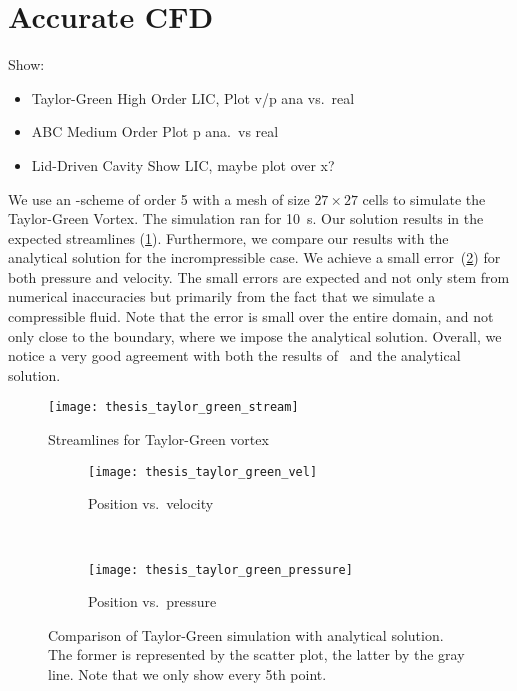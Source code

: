\section{Accurate CFD}
Show:
\begin{itemize}
\item Taylor-Green High Order
  LIC, Plot v/p ana vs.\ real
\item ABC Medium Order
  Plot p ana.\ vs real
\item Lid-Driven Cavity
  Show LIC, maybe plot over x?
\end{itemize}

We use an \aderdg{}-scheme of order 5 with a mesh of size $27 \times 27$ cells to simulate the Taylor-Green Vortex.
The simulation ran for \SI{10}{\s}.
Our solution results in the expected streamlines (\cref{fig:taylor-green-streamlines}).
Furthermore, we compare our results with the analytical solution for the incrompressible case.
We achieve a small error~(\cref{fig:taylor-green-result}) for both pressure and velocity.
The small errors are expected and not only stem from numerical inaccuracies but primarily from the fact that we simulate a compressible fluid.
Note that the error is small over the entire domain, and not only close to the boundary, where we impose the analytical solution.
Overall, we notice a very good agreement with both the results of~\cite{dumbser2016high} and the analytical solution.

\begin{figure}[htb]
  \centering
  \texttt{[image: thesis\_taylor\_green\_stream]}
  \caption{Streamlines for Taylor-Green vortex}
  \label{fig:taylor-green-streamlines}
\end{figure}

\begin{figure}[htb]
  \centering
  \begin{subfigure}[t]{0.5\textwidth}
    \centering
    \texttt{[image: thesis\_taylor\_green\_vel]}
    \caption{Position vs.\ velocity}
  \end{subfigure}~%
  \begin{subfigure}[t]{0.5\textwidth}
    \centering
    \texttt{[image: thesis\_taylor\_green\_pressure]}
    \caption{Position vs.\ pressure}
  \end{subfigure}
  \caption{\label{fig:taylor-green-result}%
    Comparison of Taylor-Green simulation with analytical solution.
    The former is represented by the scatter plot, the latter by the gray line.
    Note that we only show every 5th point.}
\end{figure}

